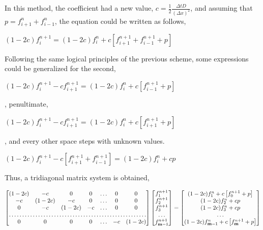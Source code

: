 \documentclass[12pt]{article}
\begin{document}
\par In this method, the coefficient had a new value, $c = \frac{1}{2}\frac{\Delta t D}{(\Delta x)^2}$, and assuming that $p = f_{i + 1}^{n} + f_{i - 1}^{n}$, the equation could be written as follows,

\begin{center}
\Large
$
(1 - 2c)f_i^{n + 1} = (1 - 2c)f_i^n + c \left[f_{i + 1}^{n + 1} + f_{i - 1}^{n + 1} + p\right]
$
\end{center}

\par Following the same logical principles of the previous scheme, 
some expressions could be generalized for the second,

\begin{center}
\Large
$
(1 - 2c)f_i^{n + 1} - c f_{i + 1}^{n + 1} = (1 - 2c)f_i^n + c \left[f_{i - 1}^{n + 1} + p\right]
$
\end{center}
, penultimate, 
\begin{center}
\Large
$
(1 - 2c)f_i^{n + 1} - c f_{i + 1}^{n + 1} = (1 - 2c)f_i^n + c \left[f_{i + 1}^{n + 1} + p\right]
$
\end{center}
, and every other space steps with unknown values.

\begin{center}
\Large
$
(1 - 2c)f_i^{n + 1} - c \left[f_{i + 1}^{n + 1} + f_{i - 1}^{n + 1}\right] = (1 - 2c)f_i^n + cp
$
\end{center}

\par Thus, a tridiagonal matrix system is obtained,

\begin{center}
\small
$
\begin{bmatrix}
    (1 - 2c) & -c & 0 & 0 & \dots & 0 & 0 \\
    -c & (1 - 2c) & -c & 0 & \dots & 0 & 0 \\
    0 & -c & (1 - 2c) & -c & \dots & 0 & 0 \\
    \hdotsfor{7} \\
    0 & 0 & 0 & 0 & \dots & -c & (1 - 2c) \\
\end{bmatrix}
\begin{bmatrix}
    f_1^{n + 1} \\
    f_2^{n + 1} \\
    f_3^{n + 1} \\
    \dots \\
    f_{\textbf{m} - 1}^{n + 1} \\
\end{bmatrix}
=
\begin{bmatrix}
    (1 - 2c)f_1^{n} + c \left[f_0^{n + 1} + p\right] \\
    (1 - 2c)f_2^{n} + cp \\
    (1 - 2c)f_3^{n} + cp\\
    \dots \\
    (1 - 2c)f_{\textbf{m} - 1}^{n} + c \left[f_{\textbf{m}}^{n + 1} + p\right] \\
\end{bmatrix}
$
\end{center}
\end{document}
